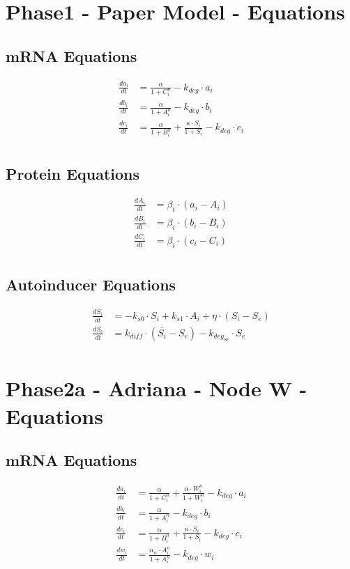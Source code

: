 \documentclass[fleqn]{article}
\begin{document}
\section*{Phase1 - Paper Model - Equations}

\subsection*{mRNA Equations}
\begin{align*}
\frac{da_i}{dt} &= \frac{\alpha}{1 + C_i^n} - k_{deg} \cdot a_i \\
\frac{db_i}{dt} &= \frac{\alpha}{1 + A_i^n} - k_{deg} \cdot b_i \\
\frac{dc_i}{dt} &= \frac{\alpha}{1 + B_i^n} + \frac{\kappa \cdot S_i}{1 + S_i} - k_{deg} \cdot c_i \\
\end{align*}

\subsection*{Protein Equations}
\begin{align*}
\frac{dA_i}{dt} &= \beta_i \cdot (a_i - A_i) \\
\frac{dB_i}{dt} &= \beta_i \cdot (b_i - B_i) \\
\frac{dC_i}{dt} &= \beta_i \cdot (c_i - C_i) \\
\end{align*}

\subsection*{Autoinducer Equations}
\begin{align*}
\frac{dS_i}{dt} &= -k_{s0} \cdot S_i + k_{s1} \cdot A_i + \eta \cdot (S_i - S_e) \\
\frac{dS_e}{dt} &= k_{diff} \cdot (\overline{S_i} - S_e) - k_{deg_{Se}} \cdot S_e \\
\end{align*}

\pagebreak

\section*{Phase2a - Adriana - Node W - Equations}

\subsection*{mRNA Equations}
\begin{align*}
\frac{da_i}{dt} &= \frac{\alpha}{1 + C_i^n} +  \frac{\alpha \cdot W_i^n}{1 + W_i^n} - k_{deg} \cdot a_i \\
\frac{db_i}{dt} &= \frac{\alpha}{1 + A_i^n} - k_{deg} \cdot b_i \\
\frac{dc_i}{dt} &= \frac{\alpha}{1 + B_i^n} + \frac{\kappa \cdot S_i}{1 + S_i} - k_{deg} \cdot c_i \\
\frac{dw_i}{dt} &= \frac{\alpha_w \cdot A_i^n}{1 + A_i^n} - k_{deg} \cdot w_i \\
\end{align*}
\end{document}
